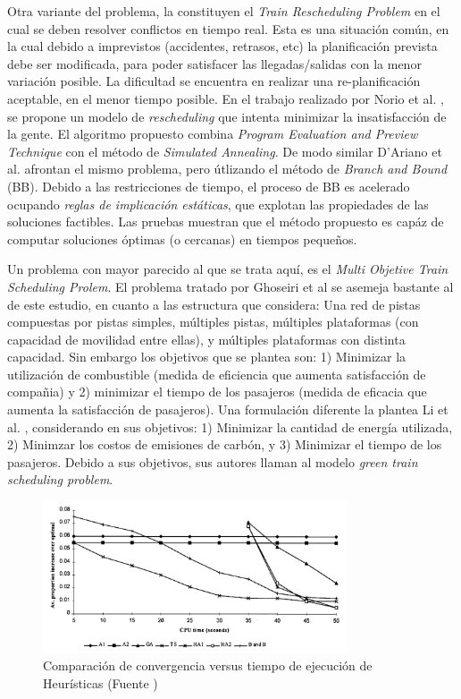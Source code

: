 \documentclass[letter, 10pt]{article}
\begin{document}
\begin{description}
	Otra variante del problema, la constituyen el \textit{Train Rescheduling Problem} en el cual se deben resolver conflictos en tiempo real. Esta es una situación común, en la cual debido a imprevistos (accidentes, retrasos, etc) la planificación prevista debe ser modificada, para poder satisfacer las llegadas/salidas con la menor variación posible. La dificultad se encuentra en realizar una re-planificación aceptable, en el menor tiempo posible. En el trabajo realizado por Norio et al. \cite{Norio}, se propone un modelo de \textit{rescheduling} que intenta minimizar la insatisfacción de la gente. El algoritmo propuesto combina \textit{Program Evaluation and Preview Technique} con el método de \textit{Simulated Annealing}. De modo similar D'Ariano et al. \cite{DAriano} afrontan el mismo problema, pero útlizando el método de \textit{Branch and Bound} (BB). Debido a las restricciones de tiempo, el proceso de BB es acelerado ocupando \textit{reglas de implicación estáticas}, que explotan las propiedades de las soluciones factibles. Las pruebas muestran que el método propuesto es capáz de computar soluciones óptimas (o cercanas) en tiempos pequeños.

	Un problema con mayor parecido al que se trata aquí, es el \textit{Multi Objetive Train Scheduling Prolem}. El problema tratado por Ghoseiri et al \cite{Ghoseiri} se asemeja bastante al de este estudio, en cuanto a las estructura que considera: Una red de pistas compuestas por pistas simples, múltiples pistas, múltiples plataformas (con capacidad de movilidad entre ellas), y múltiples plataformas con distinta capacidad. Sin embargo los objetivos que se plantea son: 1) Minimizar la utilización de combustible (medida de eficiencia que aumenta satisfacción de compañia) y 2) minimizar el tiempo de los pasajeros (medida de eficacia que aumenta la satisfacción de pasajeros). Una formulación diferente la plantea Li et al. \cite{Li}, considerando en sus objetivos: 1) Minimizar la cantidad de energía utilizada, 2) Minimzar los costos de emisiones de carbón, y 3) Minimizar el tiempo de los pasajeros. Debido a sus objetivos, sus autores llaman al modelo \textit{green train scheduling problem}.   

	\begin{figure}[htpb!]
	\centering
	\includegraphics[width=9cm]{timecomp}
	\caption{Comparación de convergencia versus tiempo de ejecución de Heurísticas (Fuente \cite{Higgins})}
	\label{fig:timecomp}
	\end{figure}





\end{description}
\end{document}

